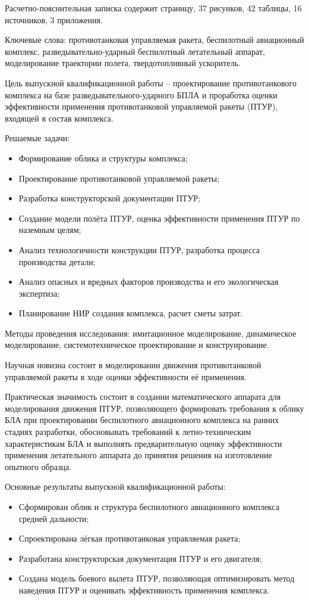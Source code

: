 \Referat

Расчетно-пояснительная записка содержит \pageref{LastPage} страницу, 37 рисунков, 42 таблицы, 16 источников, 3 приложения.

Ключевые слова: противотанковая управляемая ракета, беспилотный авиационный комплекс, разведывательно-ударный беспилотный летательный аппарат, моделирование траектории полета, твердотопливный ускоритель.

Цель выпускной квалификационной работы – проектирование противотанкового комплекса на базе разведывательного-ударного БПЛА и проработка оценки эффективности применения противотанковой управляемой ракеты (ПТУР), входящей в состав комплекса.

Решаемые задачи:
\begin{itemize}
	\item Формирование облика и структуры комплекса;
	\item Проектирование противотанковой управляемой ракеты;
	\item Разработка конструкторской документации ПТУР;
	\item Создание модели полёта ПТУР, оценка эффективности применения ПТУР по наземным целям;
	\item Анализ технологичности конструкции ПТУР, разработка процесса производства детали;
	\item Анализ опасных и вредных факторов производства и его экологическая экспертиза;
	\item Планирование НИР создания комплекса, расчет сметы затрат.
\end{itemize}

Методы проведения исследования: имитационное моделирование, динамическое моделирование, системотехническое проектирование и конструирование.

Научная новизна состоит в моделировании движения противотанковой управляемой ракеты в ходе оценки эффективности её применения.

Практическая значимость состоит в создании математического аппарата для моделирования движения ПТУР, позволяющего формировать требования к облику БЛА при проектировании беспилотного авиационного комплекса на ранних стадиях разработки, обосновывать требований к летно-техническим характеристикам БЛА и выполнять предварительную оценку эффективности применения летательного аппарата до принятия решения на изготовление опытного образца.

Основные результаты выпускной квалификационной работы:
\begin{itemize}
	\item Сформирован облик и структура беспилотного авиационного комплекса средней дальности;
	\item Спроектирована лёгкая противотанковая управляемая ракета;
	\item Разработана конструкторская документация ПТУР и его двигателя;
	\item Создана модель боевого вылета ПТУР, позволяющая оптимизировать метод наведения ПТУР и оценивать эффективность применения комплекса.
\end{itemize}

